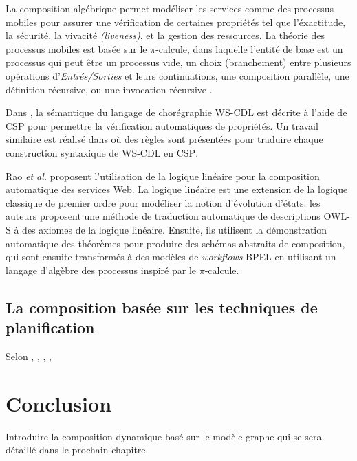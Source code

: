     La composition algébrique permet modéliser les services comme des
    processus mobiles pour assurer une vérification de certaines
    propriétés tel que l'éxactitude, la sécurité, la vivacité
    \textit{(liveness)}, et la gestion des ressources. La théorie des
    processus mobiles est basée sur le $\pi$-calcule, dans laquelle
    l'entité de base est un processus qui peut être un processus vide,
    un choix (branchement) entre plusieurs opérations
    d'\textit{Entrés/Sorties} et leurs continuations, une composition
    parallèle, une définition récursive, ou une invocation récursive
    \cite{zahirathesis2008}.

    Dans \cite{koshkina2004modelling}, la sémantique du langage de
    chorégraphie \textsc{WS-CDL} est décrite à l'aide de \textsc{CSP}
    pour permettre la vérification automatiques de propriétés. Un
    travail similaire est réalisé dans \cite{li2007modeling} où des
    règles sont présentées pour traduire chaque construction
    syntaxique de \textsc{WS-CDL} en \textsc{CSP}.

    Rao \textit{et al.} \cite{rao2004logic} proposent l'utilisation de
    la logique linéaire pour la composition automatique des services
    Web. La logique linéaire est une extension de la logique classique
    de premier ordre pour modéliser la notion d'évolution d'états. les
    auteurs proposent une méthode de traduction automatique de
    descriptions \textsc{OWL-S} à des axiomes de la logique
    linéaire. Ensuite, ils utilisent la démonstration automatique des
    théorèmes pour produire des schémas abstraits de composition, qui
    sont ensuite transformés à des modèles de \textit{workflows}
    \textsc{BPEL} en utilisant un langage d'algèbre des processus
    inspiré par le $\pi$-calcule.

    \subsection{La composition basée sur les techniques de planification}
    \label{sec:techn-de-plan}
    Selon \cite{baryannis2010}, \cite{bartalos2011effective},
    \cite{chan2007survey}, \cite{peer2005web}, \cite{rodriguez2011automatic}
    \newpage

  \section{Conclusion}
  \label{sec:conclusion}
  Introduire la composition dynamique basé sur le modèle graphe qui se
  sera détaillé dans le prochain chapitre.

